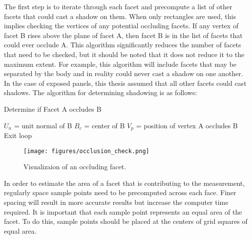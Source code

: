 The first step is to iterate through each facet and precompute a list of other facets that could cast a shadow on them. When only rectangles are used, this implies checking the vertices of any potential occluding facets. If any vertex of facet B rises above the plane of facet A, then facet B is in the list of facets that could ever occlude A. This algorithm significantly reduces the number of facets that need to be checked, but it should be noted that it does not reduce it to the maximum extent. For example, this algorithm will include facets that may be separated by the body and in reality could never cast a shadow on one another. In the case of exposed panels, this thesis assumed that all other facets could cast shadows. The algorithm for determining shadowing is as follows: 
\begin{algorithm}\label{alg:calc_obscuring}
	\caption{Determine if Facet A occludes B}
	\begin{algorithmic}
		\STATE $U_n$ = unit normal of B
		\STATE $B_c$ = center of B
		\STATE $V_p$ = position of vertex
			\STATE A occludes B
			\STATE Exit loop
		\ENDIF
		\ENDFOR
	\end{algorithmic}
\end{algorithm}
\begin{figure}[h!]
	\centering
	\texttt{[image: figures/occlusion\_check.png]}
	\caption{Visualizaion of an occluding facet.}
	\label{occluding_facet}
\end{figure}

In order to estimate the area of a facet that is contributing to the measurement, regularly space sample points need to be precomputed across each face. Finer spacing will result in more accurate results but increase the computer time required. It is important that each sample point represents an equal area of the facet. To do this, sample points should be placed at the centers of grid squares of equal area.

